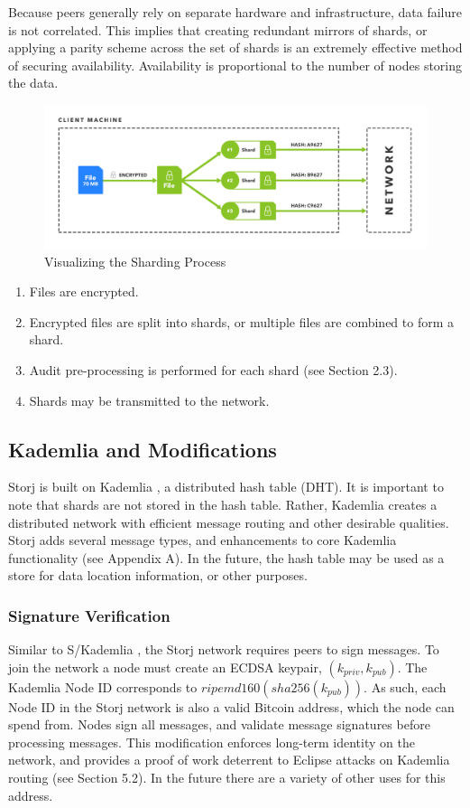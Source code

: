 \documentclass[a4paper,10pt]{article}
\begin{document}
Because peers generally rely on separate hardware and infrastructure, data failure is not correlated. This implies that creating redundant mirrors of shards, or applying a parity scheme across the set of shards is an extremely effective method of securing availability. Availability is proportional to the number of nodes storing the data.

\begin{figure}[hbt]
\centering
\includegraphics[width=\linewidth]{1}
\caption{Visualizing the Sharding Process}
\end{figure}

\begin{enumerate}
\item Files are encrypted.
\item Encrypted files are split into shards, or multiple files are combined to form a shard.
\item Audit pre-processing is performed for each shard (see Section 2.3).
\item Shards may be transmitted to the network.
\end{enumerate}

\subsection{Kademlia and Modifications}
Storj is built on Kademlia \cite{2}, a distributed hash table (DHT). It is important to note that shards are not stored in the hash table. Rather, Kademlia creates a distributed network with efficient message routing and other desirable qualities. Storj adds several message types, and enhancements to core Kademlia functionality (see Appendix A). In the future, the hash table may be used as a store for data location information, or other purposes.

\subsubsection{Signature Verification}
Similar to S/Kademlia \cite{3}, the Storj network requires peers to sign messages. To join the network a node must create an ECDSA keypair, $ (k_{priv}, k_{pub}) $. The Kademlia Node ID corresponds to $ ripemd160(sha256(k_{pub})) $. As such, each Node ID in the Storj network is also a valid Bitcoin address, which the node can spend from. Nodes sign all messages, and validate message signatures before processing messages. This modification enforces long-term identity on the network, and provides a proof of work deterrent to Eclipse attacks on Kademlia routing (see Section 5.2). In the future there are a variety of other uses for this address.
\end{document}
